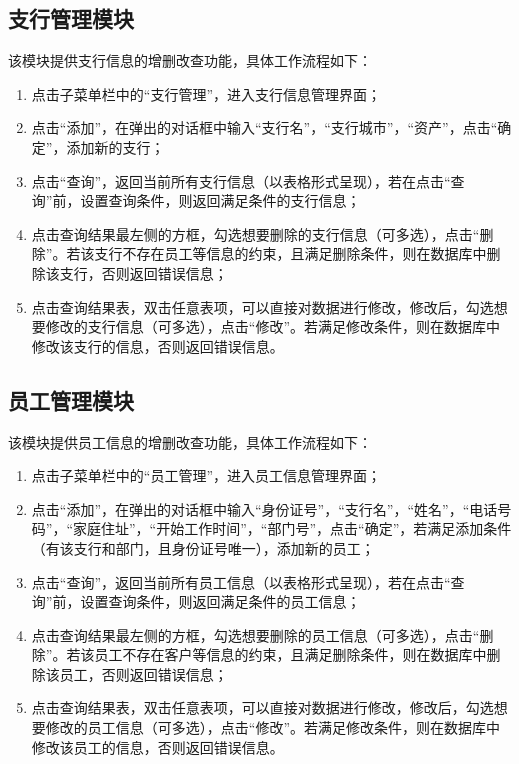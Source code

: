 \documentclass{ctexart}
\begin{document}
\subsection{\hei 支行管理模块}
该模块提供支行信息的增删改查功能，具体工作流程如下：
\begin{enumerate}
    \item 点击子菜单栏中的“支行管理”，进入支行信息管理界面；
    \item 点击“添加”，在弹出的对话框中输入“支行名”，“支行城市”，“资产”，点击“确定”，添加新的支行；
    \item 点击“查询”，返回当前所有支行信息（以表格形式呈现），若在点击“查询”前，设置查询条件，则返回满足条件的支行信息；
    \item 点击查询结果最左侧的方框，勾选想要删除的支行信息（可多选），点击“删除”。若该支行不存在员工等信息的约束，且满足删除条件，则在数据库中删除该支行，否则返回错误信息；
    \item 点击查询结果表，双击任意表项，可以直接对数据进行修改，修改后，勾选想要修改的支行信息（可多选），点击“修改”。若满足修改条件，则在数据库中修改该支行的信息，否则返回错误信息。
\end{enumerate}
\subsection{\hei 员工管理模块}
该模块提供员工信息的增删改查功能，具体工作流程如下：
\begin{enumerate}
    \item 点击子菜单栏中的“员工管理”，进入员工信息管理界面；
    \item 点击“添加”，在弹出的对话框中输入“身份证号”，“支行名”，“姓名”，“电话号码”，“家庭住址”，“开始工作时间”，“部门号”，点击“确定”，若满足添加条件（有该支行和部门，且身份证号唯一），添加新的员工；
    \item 点击“查询”，返回当前所有员工信息（以表格形式呈现），若在点击“查询”前，设置查询条件，则返回满足条件的员工信息；
    \item 点击查询结果最左侧的方框，勾选想要删除的员工信息（可多选），点击“删除”。若该员工不存在客户等信息的约束，且满足删除条件，则在数据库中删除该员工，否则返回错误信息；
    \item 点击查询结果表，双击任意表项，可以直接对数据进行修改，修改后，勾选想要修改的员工信息（可多选），点击“修改”。若满足修改条件，则在数据库中修改该员工的信息，否则返回错误信息。
\end{enumerate}
\end{document}
